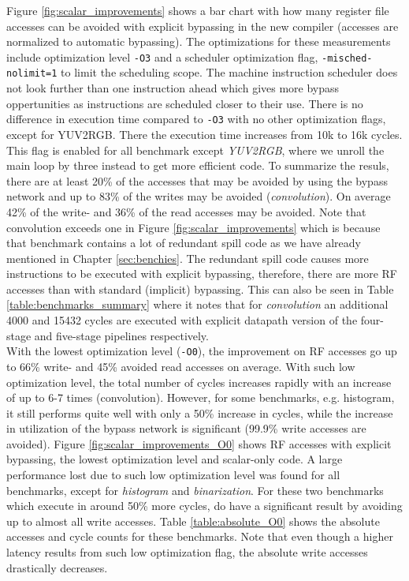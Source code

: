 Figure \ref{fig:scalar_improvements} shows a bar chart with how many register file accesses can be avoided with explicit bypassing in the new compiler (accesses are normalized to automatic bypassing). The optimizations for these measurements include optimization level \texttt{-O3} and a scheduler optimization flag, \texttt{-misched-nolimit=1} to limit the scheduling scope. The machine instruction scheduler does not look further than one instruction ahead which gives more bypass oppertunities as instructions are scheduled closer to their use. There is no difference in execution time compared to \texttt{-O3} with no other optimization flags, except for YUV2RGB. There the execution time increases from 10k to 16k cycles. This flag is enabled for all benchmark except \emph{YUV2RGB}, where we unroll the main loop by three instead to get more efficient code. To summarize the resuls, there are at least 20\% of the accesses that may be avoided by using the bypass network and up to 83\% of the writes may be avoided (\emph{convolution}). On average 42\% of the write- and 36\% of the read accesses may be avoided. Note that convolution exceeds one in Figure \ref{fig:scalar_improvements} which is because that benchmark contains a lot of redundant spill code as we have already mentioned in Chapter \ref{sec:benchies}. The redundant spill code causes more instructions to be executed with explicit bypassing, therefore, there are more RF accesses than with standard (implicit) bypassing. This can also be seen in Table \ref{table:benchmarks_summary} where it notes that for \emph{convolution} an additional 4000 and 15432 cycles are executed with explicit datapath version of the four-stage and five-stage pipelines respectively.\\

With the lowest optimization level (\texttt{-O0}), the improvement on RF accesses go up to 66\% write- and 45\% avoided read accesses on average. With such low optimization level, the total number of cycles increases rapidly with an increase of up to 6-7 times (convolution). However, for some benchmarks, e.g. histogram, it still performs quite well with only a 50\% increase in cycles, while the increase in utilization of the bypass network is significant (99.9\% write accesses are avoided). Figure \ref{fig:scalar_improvements_O0} shows RF accesses with explicit bypassing, the lowest optimization level and scalar-only code. A large performance lost due to such low optimization level was found for all benchmarks, except for \emph{histogram} and \emph{binarization}. For these two benchmarks which execute in around 50\% more cycles, do have a significant result by avoiding up to almost all write accesses. Table \ref{table:absolute_O0} shows the absolute accesses and cycle counts for these benchmarks. Note that even though a higher latency results from such low optimization flag, the absolute write accesses drastically decreases.

